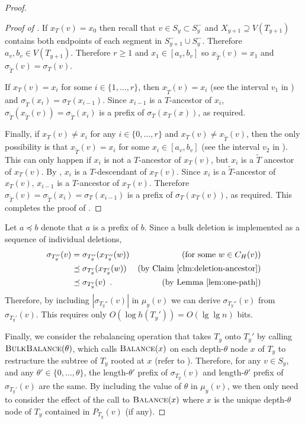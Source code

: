 \documentclass[kpfonts]{patmorin}
\let\ge\geqslant
\begin{document}
\begin{proof}
\begin{proof}[Proof of ]
    If $x_T(v)=x_0$ then recall that $v\in S_y\subset S^-_y$ and $X_{y+1}\supseteq V(T_{y+1})$ contains both endpoints of each segment in $S^-_{y+1}\cup S^-_y$.  Therefore $a_v,b_v\in V(T_{y+1})$.  Therefore $r\ge 1$ and $x_1\in [a_v,b_v]$ so $x_{\tilde{T}}(v)=x_1$ and $\sigma_{\tilde{T}}(v)=\sigma_T(v)$.
    
    If $x_T(v)=x_i$ for some $i\in\{1,\ldots,r\}$, then $x_{\tilde{T}}(v)=x_i$ (see the interval $v_1$ in ) and $\sigma_{\tilde{T}}(x_i)=\sigma_{T}(x_{i-1})$.  Since $x_{i-1}$ is a $T$-ancestor of $x_i$, $\sigma_{\tilde{T}}(x_{\tilde{T}}(v))=\sigma_{\tilde{T}}(x_i)$ is a prefix of $\sigma_{T}(x_{T}(x))$, as required.
    
    Finally, if $x_T(v)\neq x_i$ for any $i\in\{0,\ldots,r\}$ and $x_T(v)\neq x_{\tilde{T}}(v)$, then the only possibility is that $x_{\tilde{T}}(v)=x_i$ for some $x_i\in [a_v,b_v]$ (see the interval $v_2$ in ).  This can only happen if $x_i$ is not a $T$-ancestor of $x_T(v)$, but $x_i$ is a $\tilde{T}$ ancestor of $x_T(v)$.  By , $x_i$ is a $T$-descendant of $x_T(v)$.  Since $x_i$ is a $\tilde{T}$-ancestor of $x_T(v)$, $x_{i-1}$ is a $T$-ancestor of $x_T(v)$.  Therefore $\sigma_{\tilde{T}}(v)=\sigma_{\tilde{T}}(x_i)=\sigma_T(x_{i-1})$ is a prefix of $\sigma_T(x_T(v))$, as required.  This completes the proof of .    
  \end{proof}
  
  Let $a\preceq b$ denote that $a$ is a prefix of $b$.
  Since a bulk deletion is implemented as a sequence of individual deletions,
  \begin{align*}
    \sigma_{T_y''}(v) 
      & = \sigma_{T_y''}(x_{T_y''}(w)) & \text{(for some $w\in C_H(v)$)} \\
      & \preceq \sigma_{T_y'}(x_{T_y'}(w)) & \text{(by \clmref{deletion-ancestor})} \\
      & \preceq \sigma_{T_y'}(v) \enspace . & \text{(by \lemref{one-path})}
  \end{align*} 
  Therefore, by including $|\sigma_{T_y''}(v)|$ in $\mu_y(v)$ we can derive $\sigma_{T_y''}(v)$ from $\sigma_{T_y'}(v)$.  This requires only $O(\log h({T_y'}))=O(\lg\lg n)$ bits.
  
  Finally, we consider the rebalancing operation that takes $T_y$ onto $T_y'$ by calling $\textsc{BulkBalance}(\theta)$, which calls $\textsc{Balance}(x)$ on each depth-$\theta$ node $x$ of $T_y$ to restructure the subtree of $T_y$ rooted at $x$ (refer to ). Therefore, for any $v\in S_y$, and any $\theta'\in\{0,\ldots,\theta\}$, the length-$\theta'$ prefix of $\sigma_{T_y}(v)$ and length-$\theta'$ prefix of $\sigma_{T_y'}(v)$ are the same.  By including the value of $\theta$ in $\mu_y(v)$, we then only need to consider the effect of the call to $\textsc{Balance}(x)$ where $x$ is the unique depth-$\theta$ node of $T_y$ contained in $P_{T_y}(v)$ (if any).
  

\end{proof}
\end{document}
